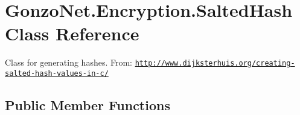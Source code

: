 \hypertarget{class_gonzo_net_1_1_encryption_1_1_salted_hash}{\section{Gonzo\+Net.\+Encryption.\+Salted\+Hash Class Reference}
\label{class_gonzo_net_1_1_encryption_1_1_salted_hash}
}


Class for generating hashes. From\+: \href{http://www.dijksterhuis.org/creating-salted-hash-values-in-c/}{\tt http\+://www.\+dijksterhuis.\+org/creating-\/salted-\/hash-\/values-\/in-\/c/}  


\subsection*{Public Member Functions}

